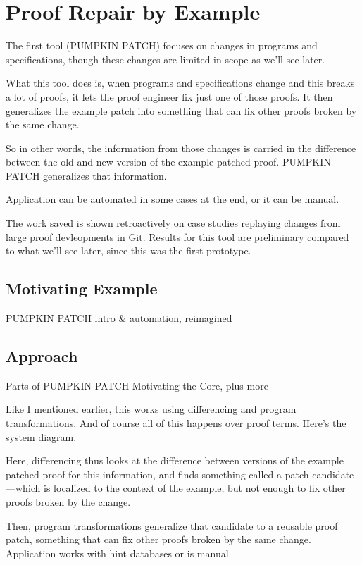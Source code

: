 \chapter{Proof Repair by Example}

The first tool (PUMPKIN PATCH) focuses on changes in programs and specifications, though these changes are limited in scope as we'll see later.

What this tool does is, when programs and specifications change and this breaks a lot of proofs, it lets the proof engineer fix just one of those proofs. It then generalizes the example patch into something that can fix other proofs broken by the same change.

So in other words, the information from those changes is carried in the difference between the old and new version of the example patched proof.
PUMPKIN PATCH generalizes that information.

Application can be automated in some cases at the end, or it can be manual.

The work saved is shown retroactively on case studies replaying changes from large proof devleopments in Git. Results for this tool are preliminary compared to what we'll see later, since this was the first prototype.

\section{Motivating Example}

PUMPKIN PATCH intro \& automation, reimagined

\section{Approach}

Parts of PUMPKIN PATCH Motivating the Core, plus more

Like I mentioned earlier, this works using differencing and program transformations. And of course all of this happens over proof terms.
Here's the system diagram.

Here, differencing thus looks at the difference between versions of the example patched proof for this information, and finds something called a patch candidate---which is localized to the context of the example, but not enough to fix other proofs broken by the change.

Then, program transformations generalize that candidate to a reusable proof patch, something that can fix other proofs broken by the same change.
Application works with hint databases or is manual.

